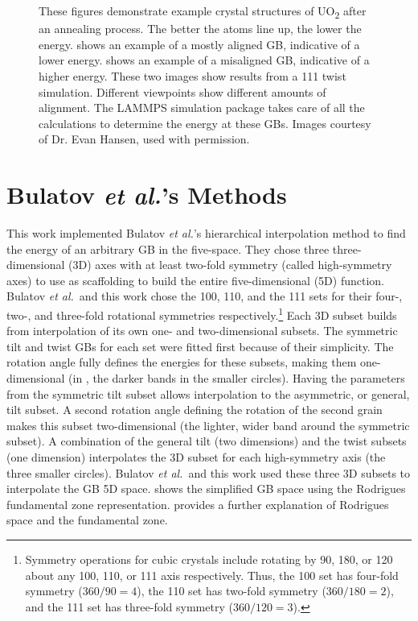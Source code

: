 \documentclass[twoside,senior]{BYUPhys}
\begin{document}
\begin{figure}[ht!]
 \caption[An example of crystal structure after annealing.]{\label{fig:lammps}These figures demonstrate example crystal structures of UO\textsubscript{2} after an annealing process.  The better the atoms line up, the lower the energy. \protect{} shows an example of a mostly aligned GB, indicative of a lower energy.  \protect{} shows an example of a misaligned GB, indicative of a higher energy.  These two images show results from a \textlangle{}111\textrangle{} twist simulation.  Different viewpoints show different amounts of alignment.  The LAMMPS simulation package takes care of all the calculations to determine the energy at these GBs. Images courtesy of Dr. Evan Hansen, used with permission.}
\end{figure}

\section{Bulatov \emph{et al.}'s Methods\label{methods:bulatov}}
This work implemented Bulatov \emph{et al.}'s hierarchical interpolation method to find the energy of an arbitrary GB in the five-space.\cite{bulatov2014}  They chose three three-dimensional (3D) axes with at least two-fold symmetry (called high-symmetry axes) to use as scaffolding to build the entire five-dimensional (5D) function.  Bulatov \emph{et al.}\ and this work chose the \textlangle{}100\textrangle{}, \textlangle{}110\textrangle{}, and the \textlangle{}111\textrangle{} sets for their four-, two-, and three-fold rotational symmetries respectively.\footnote{Symmetry operations for cubic crystals include rotating by 90\textdegree{}, 180\textdegree{}, or 120\textdegree{} about any \textlangle{}100\textrangle{}, \textlangle{}110\textrangle{}, or \textlangle{}111\textrangle{} axis respectively.\cite{stokes2007}  Thus, the \textlangle{}100\textrangle{} set has four-fold symmetry (360\textdegree{}$/90$\textdegree{}$=4$), the \textlangle{}110\textrangle{} set has two-fold symmetry (360\textdegree{}$/180$\textdegree{}$=2$), and the \textlangle{}111\textrangle{} set has three-fold symmetry (360\textdegree{}$/120$\textdegree{}$=3$).}  Each 3D subset builds from interpolation of its own one- and two-dimensional subsets.  The symmetric tilt and twist GBs for each set were fitted first because of their simplicity.  The rotation angle fully defines the energies for these subsets, making them one-dimensional (in , the darker bands in the smaller circles).  Having the parameters from the symmetric tilt subset allows interpolation to the asymmetric, or general, tilt subset.  A second rotation angle defining the rotation of the second grain makes this subset two-dimensional (the lighter, wider band around the symmetric subset).  A combination of the general tilt (two dimensions) and the twist subsets (one dimension) interpolates the 3D subset for each high-symmetry axis (the three smaller circles).  Bulatov \emph{et al.}\ and this work used these three 3D subsets to interpolate the GB 5D space.  shows the simplified GB space using the Rodrigues fundamental zone representation.  provides a further explanation of Rodrigues space and the fundamental zone.
\end{document}
